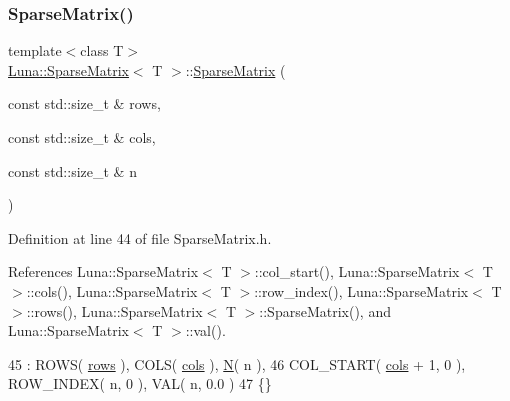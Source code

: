 \subsubsection{\texorpdfstring{Sparse\+Matrix()}{SparseMatrix()}\hspace{0.1cm}{\footnotesize\ttfamily [2/5]}}
{\footnotesize\ttfamily template$<$class T$>$ \\
\hyperlink{classLuna_1_1SparseMatrix}{Luna\+::\+Sparse\+Matrix}$<$ T $>$\+::\hyperlink{classLuna_1_1SparseMatrix}{Sparse\+Matrix} (\begin{DoxyParamCaption}\item[{const std\+::size\+\_\+t \&}]{rows,  }\item[{const std\+::size\+\_\+t \&}]{cols,  }\item[{const std\+::size\+\_\+t \&}]{n }\end{DoxyParamCaption})\hspace{0.3cm}{\ttfamily [inline]}}



Definition at line 44 of file Sparse\+Matrix.\+h.



References Luna\+::\+Sparse\+Matrix$<$ T $>$\+::col\+\_\+start(), Luna\+::\+Sparse\+Matrix$<$ T $>$\+::cols(), Luna\+::\+Sparse\+Matrix$<$ T $>$\+::row\+\_\+index(), Luna\+::\+Sparse\+Matrix$<$ T $>$\+::rows(), Luna\+::\+Sparse\+Matrix$<$ T $>$\+::\+Sparse\+Matrix(), and Luna\+::\+Sparse\+Matrix$<$ T $>$\+::val().


\begin{DoxyCode}
45                                        : ROWS( \hyperlink{classLuna_1_1SparseMatrix_a970319496e5f0b963e4810f2ecbd93b6}{rows} ), COLS( \hyperlink{classLuna_1_1SparseMatrix_aff9e25ce05b5d11c3490f37fcd2ccfb0}{cols} ), \hyperlink{namespaceHeat__plot_a7d050092798e28458a263710837bda77}{N}( n ),
46                   COL\_START( \hyperlink{classLuna_1_1SparseMatrix_aff9e25ce05b5d11c3490f37fcd2ccfb0}{cols} + 1, 0 ), ROW\_INDEX( n, 0 ), VAL( n, 0.0 )
47     \{\}
\end{DoxyCode}
\mbox{\label{classLuna_1_1SparseMatrix_ab698bd7ea02f6ab52f6b874fdefa84df}} 
